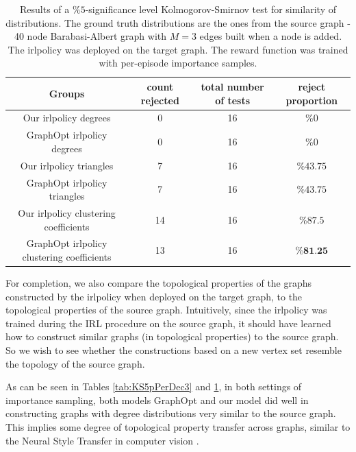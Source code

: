\documentclass{report}
\numberwithin{equation}{section}
\numberwithin{figure}{section}
\numberwithin{table}{section}
\numberwithin{algorithm}{section}
\begin{document}
\begin{table}[!h]
  \begin{center}
    \caption{\label{tab:KS5pVanilla3} 
    Results of a $\%5$-significance level 
    Kolmogorov-Smirnov 
    test for similarity of distributions. 
    The ground truth distributions are the ones 
    from the source graph - 40 node Barabasi-Albert graph 
    with $M=3$ edges built when a node is added. The irlpolicy 
    was deployed on the target graph. The reward 
    function was trained with per-episode importance samples.}
    \begin{tabular}{|c|c|c|c|}
      \hline
      \textbf{Groups} & \textbf{count rejected} & \textbf{total number of tests} & \textbf{reject proportion}\\
      \hline
      Our irlpolicy degrees & 0 & 16 & $\%0$\\
      GraphOpt irlpolicy degrees & 0 & 16 & $\%0$\\
      \hline
      Our irlpolicy triangles & 7 & 16 & $\%43.75$\\
      GraphOpt irlpolicy triangles & 7 & 16 & $\%43.75$\\
      \hline
      Our irlpolicy clustering coefficients & 14 & 16 & $\%87.5$\\
      GraphOpt irlpolicy clustering coefficients & 13 & 16 & $\%\textbf{81.25}$\\
      \hline
    \end{tabular}
  \end{center}
\end{table}

For completion, we also compare the topological properties 
of the graphs constructed by the irlpolicy when deployed on 
the target graph, to the topological properties of the source graph. 
Intuitively, since the irlpolicy was trained during the IRL 
procedure on the source graph, it should have learned how to 
construct similar graphs (in topological properties) to the source 
graph. So we wish to see whether the constructions based on a 
new vertex set resemble the topology of the source graph.

As can be seen in Tables \ref{tab:KS5pPerDec3} and \ref{tab:KS5pVanilla3}, 
in both settings of importance sampling, both models GraphOpt and 
our model did well in constructing graphs with degree distributions 
very similar to the source graph. This implies some degree of 
topological property transfer across graphs, similar to the 
Neural Style Transfer in computer vision \citep{NSTGatys}.
\end{document}
